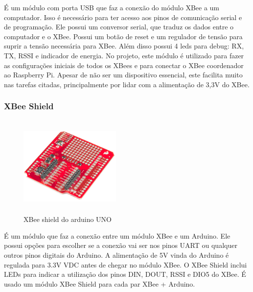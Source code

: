 É um módulo com porta USB que faz a conexão do módulo XBee a um computador. Isso é necessário para ter acesso aos pinos de comunicação serial e de programação. Ele possui um conversor serial, que traduz os dados entre o computador e o XBee. Possui um botão de reset e um regulador de tensão para suprir a tensão necessária para XBee. Além disso possui 4 leds para debug: RX, TX, RSSI e indicador de energia. No projeto, este módulo é utilizado para fazer as configurações iniciais de todos os XBees e para conectar o XBee coordenador ao Raspberry Pi. Apesar de não ser um dispositivo essencial, este facilita muito nas tarefas citadas,  principalmente por lidar com a alimentação de 3,3V do XBee.

\subsubsection{XBee Shield}
\begin{figure}[H]
\begin{center}
\includegraphics[width=5cm,height=5cm,keepaspectratio]{figuras/xbee_shield.png}
\caption{\label{fig:xbee shield} XBee shield do arduino UNO}
\end{center}
\end{figure}

É um módulo que faz a conexão entre um módulo XBee e um Arduino. Ele possui opções para escolher se a conexão vai ser nos pinos UART ou qualquer outros pinos digitais do Arduino. A alimentação de 5V vinda do Arduino é regulada para 3.3V VDC antes de chegar no módulo XBee. O XBee Shield inclui LEDs para indicar a utilização dos pinos DIN, DOUT, RSSI e DIO5 do XBee. É usado um módulo XBee Shield para cada par XBee + Arduino.


